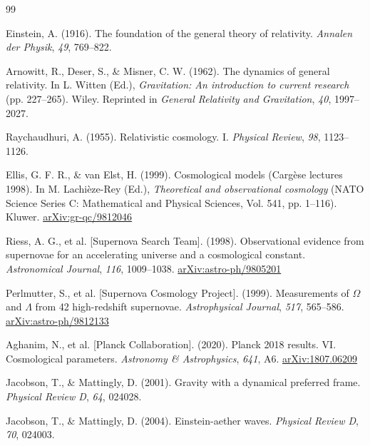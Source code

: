 \clearpage
\begingroup
\renewcommand{\refname}{References}
\makeatletter
\renewcommand{\@biblabel}[1]{}
\makeatother
\begin{thebibliography}{99}
\small
\setlength{\itemsep}{0.25em}
\setlength{\parskip}{0pt}

Einstein, A. (1916). The foundation of the general theory of relativity. \emph{Annalen der Physik}, \emph{49}, 769--822.

Arnowitt, R., Deser, S., \& Misner, C. W. (1962). The dynamics of general relativity. In L. Witten (Ed.), \emph{Gravitation: An introduction to current research} (pp. 227--265). Wiley. Reprinted in \emph{General Relativity and Gravitation}, \emph{40}, 1997--2027.

Raychaudhuri, A. (1955). Relativistic cosmology. I. \emph{Physical Review}, \emph{98}, 1123--1126.

Ellis, G. F. R., \& van Elst, H. (1999). Cosmological models (Carg\`ese lectures 1998). In M. Lachi\`eze-Rey (Ed.), \emph{Theoretical and observational cosmology} (NATO Science Series C: Mathematical and Physical Sciences, Vol. 541, pp. 1--116). Kluwer. \href{https://arxiv.org/abs/gr-qc/9812046}{arXiv:gr-qc/9812046}

Riess, A. G., et al. [Supernova Search Team]. (1998). Observational evidence from supernovae for an accelerating universe and a cosmological constant. \emph{Astronomical Journal}, \emph{116}, 1009--1038. \href{https://arxiv.org/abs/astro-ph/9805201}{arXiv:astro-ph/9805201}

Perlmutter, S., et al. [Supernova Cosmology Project]. (1999). Measurements of $\Omega$ and $\Lambda$ from 42 high-redshift supernovae. \emph{Astrophysical Journal}, \emph{517}, 565--586. \href{https://arxiv.org/abs/astro-ph/9812133}{arXiv:astro-ph/9812133}

Aghanim, N., et al. [Planck Collaboration]. (2020). Planck 2018 results. VI. Cosmological parameters. \emph{Astronomy \& Astrophysics}, \emph{641}, A6. \href{https://arxiv.org/abs/1807.06209}{arXiv:1807.06209}

Jacobson, T., \& Mattingly, D. (2001). Gravity with a dynamical preferred frame. \emph{Physical Review D}, \emph{64}, 024028.

Jacobson, T., \& Mattingly, D. (2004). Einstein-aether waves. \emph{Physical Review D}, \emph{70}, 024003.


\end{thebibliography}
